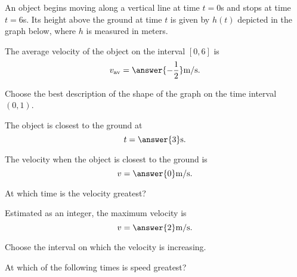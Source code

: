 \documentclass{ximera}
\author{Nela Lakos \and Kyle Parsons}
\begin{document}
\begin{exercise}

An object begins moving along a vertical line at time $t=0$s and stops at time $t=6$s.  Its height above the ground at time $t$ is given by $h(t)$ depicted in the graph below, where $h$ is measured in meters.

\begin{image}
\end{image}

The average velocity of the object on the interval $\left[0,6\right]$ is
\[
v_{\text{av}} = \answer{-\frac{1}{2}}\text{m/s}.
\]

Choose the best description of the shape of the graph on the time interval $\left(0,1\right)$.
\begin{multipleChoice}
\end{multipleChoice}

The object is closest to the ground at 
\[
t=\answer{3}\text{s}.
\]

The velocity when the object is closest to the ground is 
\[
v=\answer{0}\text{m/s}.
\]

At which time is the velocity greatest?
\begin{multipleChoice}
\end{multipleChoice}

Estimated as an integer, the maximum velocity is
\[
v=\answer{2}\text{m/s}.
\]

Choose the interval on which the velocity is increasing.
\begin{multipleChoice}
\end{multipleChoice}

At which of the following times is speed greatest?
\begin{multipleChoice}
\end{multipleChoice}

\end{exercise}
\end{document}
